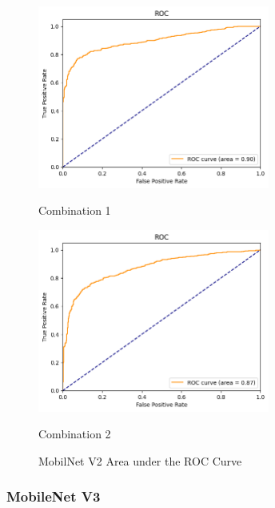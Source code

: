 \begin{figure}[H]
    \centering
    \begin{minipage}[b]{0.49\textwidth}
        \centering
        \includegraphics[width=\textwidth, height=6cm]{Figures/balanced_data/less_data/withoutbn/mn2/roc.png}
        \captionsetup{labelformat=empty}
        \caption{Combination 1}
        \label{fig:u_wo_r_roc}
    \end{minipage}
    \hfill
    \begin{minipage}[b]{0.49\textwidth}
        \centering
        \includegraphics[width=\textwidth, height=6cm]{Figures/balanced_data/less_data/withbn/mn2/roc.png}
        \captionsetup{labelformat=empty}
        \caption{Combination 2}
        \label{fig:u_w_r_roc}
    \end{minipage}
    \captionsetup{labelformat=default}
    \caption{MobilNet V2 Area under the ROC Curve}
\end{figure}

\subsubsection{MobileNet V3}

